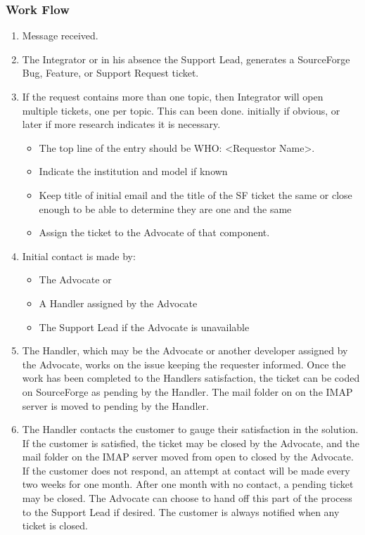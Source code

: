 \subsubsection{Work Flow}
\begin{enumerate}
\item Message received.
\item The Integrator or in his absence the Support Lead, generates a SourceForge Bug, Feature, or Support Request ticket.
\item If the request contains more than one topic, then Integrator will open multiple tickets, one per topic. This can been done.
initially if obvious, or later if more research indicates it is necessary. 

\begin{itemize}
\item The top line of the entry should be WHO: <Requestor Name>.
\item Indicate the institution and model if known
\item Keep title of initial email and the title of the SF ticket the
same or close enough to be able to determine they are one and the same
\item Assign the ticket to the Advocate of that component. 
\end{itemize}

\item Initial contact is made by:

\begin{itemize}
\item The Advocate or
\item A Handler assigned by the Advocate
\item The Support Lead if the Advocate is unavailable
\end{itemize}

\item The Handler, which may be the Advocate or another developer assigned by the Advocate, works on the issue keeping the requester informed. Once the work has been completed to the Handlers satisfaction, the ticket can be coded on SourceForge as pending by the Handler.  The mail folder on 
on the IMAP server is moved to pending by the Handler.

\item The Handler contacts the customer to gauge their satisfaction in the solution. If the customer is satisfied, the ticket may be closed by the Advocate, and the mail folder on the IMAP server moved from open to 
closed by the Advocate.  If the customer does not respond, an attempt at contact will be made every two weeks for one month.  After one month with no contact, a pending ticket may be closed.  The Advocate can choose to hand off this part of the process to the Support Lead if desired.  The customer is always notified when any ticket is closed. 
\end{enumerate}

